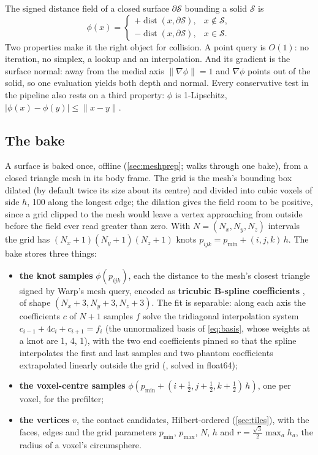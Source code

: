 The signed distance field of a closed surface $\partial\mathcal S$ bounding a solid $\mathcal S$ is
\begin{equation}\label{eq:sdf}
\phi(x) = \begin{cases} +\operatorname{dist}(x, \partial\mathcal S), & x \notin \mathcal S, \\ -\operatorname{dist}(x, \partial\mathcal S), & x \in \mathcal S. \end{cases}
\end{equation}
Two properties make it the right object for collision. A point query is $O(1)$: no iteration, no simplex, a lookup and an interpolation. And its gradient is the surface normal: away from the medial axis $\lVert\nabla\phi\rVert = 1$ and $\nabla\phi$ points out of the solid, so one evaluation yields both depth and normal. Every conservative test in the pipeline also rests on a third property: $\phi$ is 1-Lipschitz, $\lvert\phi(x) - \phi(y)\rvert \le \lVert x - y\rVert$.

\subsection{The bake}\label{sec:bake}

A surface is baked once, offline (\cref{sec:meshprep};  walks through one bake), from a closed triangle mesh in its body frame. The grid is the mesh's bounding box dilated (by default twice its size about its centre) and divided into cubic voxels of side $h$, 100 along the longest edge; the dilation gives the field room to be positive, since a grid clipped to the mesh would leave a vertex approaching from outside before the field ever read greater than zero. With $N = (N_x, N_y, N_z)$ intervals the grid has $(N_x+1)(N_y+1)(N_z+1)$ knots $p_{ijk} = p_{\min} + (i, j, k)\,h$. The bake stores three things:

\begin{itemize}
\item \textbf{the knot samples} $\phi(p_{ijk})$, each the distance to the mesh's closest triangle signed by Warp's mesh query, encoded as \textbf{tricubic B-spline coefficients} , of shape $(N_x+3, N_y+3, N_z+3)$. The fit is separable: along each axis the coefficients $c$ of $N+1$ samples $f$ solve the tridiagonal interpolation system $c_{i-1} + 4c_i + c_{i+1} = f_i$ (the unnormalized basis of \cref{eq:basis}, whose weights at a knot are 1, 4, 1), with the two end coefficients pinned so that the spline interpolates the first and last samples and two phantom coefficients extrapolated linearly outside the grid (, solved in float64);
\item \textbf{the voxel-centre samples}  $\phi(p_{\min} + (i + \tfrac12, j+\tfrac12, k+\tfrac12)\,h)$, one per voxel, for the prefilter;
\item \textbf{the vertices} $v$, the contact candidates, Hilbert-ordered (\cref{sec:tiles}), with the faces, edges and the grid parameters $p_{\min}$, $p_{\max}$, $N$, $h$ and $r = \tfrac{\sqrt 3}{2}\max_a h_a$, the radius of a voxel's circumsphere.
\end{itemize}

